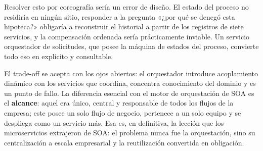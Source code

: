 Resolver esto por coreografía sería un error de diseño. El estado del proceso no residiría en ningún sitio, responder a la pregunta «¿por qué se denegó esta hipoteca?» obligaría a reconstruir el historial a partir de los registros de siete servicios, y la compensación ordenada sería prácticamente inviable. Un servicio orquestador de solicitudes, que posee la máquina de estados del proceso, convierte todo eso en explícito y consultable.

El trade-off se acepta con los ojos abiertos: el orquestador introduce acoplamiento dinámico con los servicios que coordina, concentra conocimiento del dominio y es un punto de fallo. La diferencia esencial con el motor de orquestación de SOA es el \textbf{alcance}: aquel era único, central y responsable de todos los flujos de la empresa; este posee un solo flujo de negocio, pertenece a un solo equipo y se despliega como un servicio más. Esa es, en definitiva, la lección que los microservicios extrajeron de SOA: el problema nunca fue la orquestación, sino su centralización a escala empresarial y la reutilización convertida en obligación.
